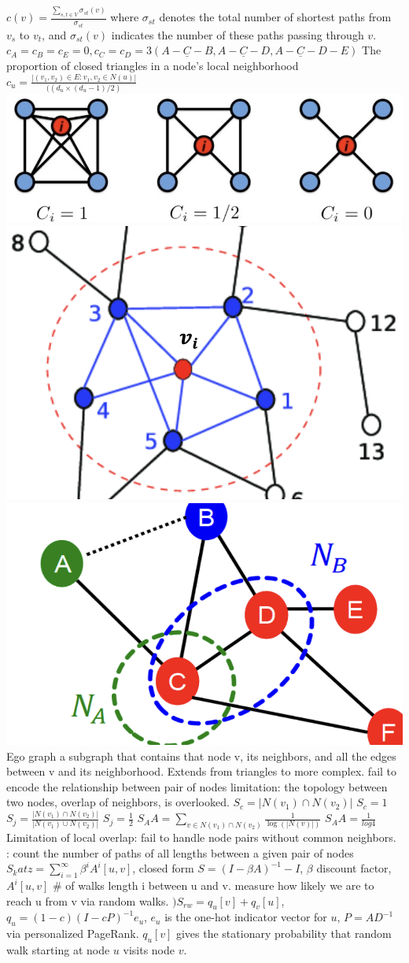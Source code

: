  \(c(v) = \frac{\sum_{s,t \in V} \sigma_{st}(v)}{\sigma_{st}}\)
where \( \sigma_{st} \) denotes the total number of shortest paths from \( v_s \) to \( v_t \), and \( \sigma_{st}(v) \) indicates the number of these paths passing through \( v \).  \(c_A=c_B=c_E=0, c_C=c_D=3 (A-\underline{C}-B, A-\underline{C}-D, A-\underline{C}-D-E)\)
 The proportion of closed triangles in a node’s local neighborhood
\(c_u = \frac{\left| (v_1, v_2) \in E : v_1, v_2 \in N(u) \right|}{((d_u \times (d_u - 1) / 2 )} \)
\includegraphics[height=0.025\textwidth]{figs/l2-1.png}
\includegraphics[height=0.025\textwidth]{figs/l2-2.jpg}
\includegraphics[height=0.025\textwidth]{figs/l2-3.png}
Ego graph a subgraph that contains that node v, its neighbors, and all the edges between v and its neighborhood. 
 Extends from triangles to more complex.  fail to encode the relationship between pair of nodes
  limitation: the topology between two nodes, overlap of neighbors, is overlooked.
\( S_c = |N(v_1) \cap N(v_2)| \)
\( S_c = 1 \)
\(S_j = \frac{|N(v_1) \cap N(v_2)|}{|N(v_1) \cup N(v_2)|}\) 
\( S_j = \frac{1}{2} \)
\(S_AA = \sum_{v \in N(v_1) \cap N(v_2)} \frac{1}{\log(|N(v)|)}\) 
\( S_AA = \frac{1}{log4} \)
Limitation of local overlap: fail to handle node pairs without common neighbors.
: count the number of paths of all lengths between a given pair of nodes \(S_katz=\sum_{i=1}^{\infty}\beta^i A^i[u,v]\), closed form \(S=(I-\beta A)^{-1} - I\), \(\beta\) discount factor, \(A^i[u,v]\) \# of walks length i between u and v.
 measure how likely we are to reach u from v via random walks.
\() S_{rw} = q_{u}[v] + q_{v}[u]\), \( q_{u} = (1 - c)(I - cP)^{-1} e_{u}\), \( e_{u} \) is the one-hot indicator vector for \( u \), \( P = AD^{-1} \) via personalized PageRank.
\( q_{u}[v]\) gives the stationary probability that random walk starting at node \( u \) visits node \( v \).
